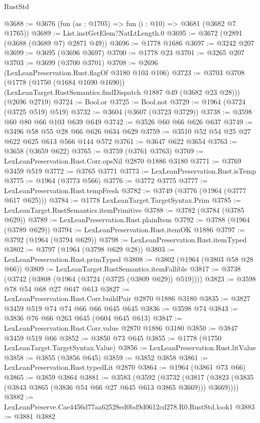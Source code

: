 \begin{lexlean}{RustStd}
\begin{coremodule}
@3688 := @3676 (fun (as : @1705) => fun (i : @10) => @3681 (@3682 @7 @1765))
@3689 := List.instGetElem?NatLtLength.{0}
@3695 := @3672 (@2891 (@3688 (@3689 @7) @2871 @49))
@3696 := @1778 @1686
@3697 := @3242 @207
@3699 := @3695 (@3696 @3697)
@3700 := @1778 @23
@3701 := @3265 @207
@3703 := @3699 (@3700 @3701)
@3708 := @2696 (LexLeanPreservation.Rust.flagOf @3180 @103 @106)
@3723 := @3703
    @3708
    (@1778
      (@1750 (@1684 @1690 @1690))
      (LexLeanTarget.RustSemantics.findDispatch @1887 @49 (@3682 @23 @28)))
    (@2696 @2719)
@3724 := Bool.or
@3725 := Bool.not
@3729 := @1964 (@3724 (@3725 @519) @519)
@3732 := @3604 (@3607 (@3723 @3729))
@3738 := @3598 @60 @80 @66 @103 @639 @649
@3742 := @3526 @60 @66 @626 @637
@3749 := @3496 @58 @55 @28 @66 @626 @634 @629
@3759 := @3510 @52 @54 @25 @27 @622 @625 @613 @566 @144 @572
@3761 := @3647 @622 @3654
@3763 := @3658 (@3659 @622)
@3765 := @3759 (@3761 @3763)
@3769 := LexLeanPreservation.Rust.Corr.opsNil @2870 @1886 @3180
@3771 := @3769 @3459 @519
@3772 := @3765 @3771
@3773 := LexLeanPreservation.Rust.isTemp
@3775 := @1964 (@3773 @566)
@3776 := @3772 @3775
@3777 := LexLeanPreservation.Rust.tempFresh
@3782 := @3749 (@3776 (@1964 (@3777 @617 @625)))
@3784 := @1778 LexLeanTarget.TargetSyntax.Prim
@3785 := LexLeanTarget.RustSemantics.itemPrimitive
@3788 := @3782 (@3784 (@3785 @629))
@3789 := LexLeanPreservation.Rust.plainItem
@3792 := @3788 (@1964 (@3789 @629))
@3794 := LexLeanPreservation.Rust.itemOK @1886
@3797 := @3792 (@1964 (@3794 @629))
@3798 := LexLeanPreservation.Rust.itemTyped
@3802 := @3797 (@1964 (@3798 @629 @28))
@3803 := LexLeanPreservation.Rust.primTyped
@3808 := @3802 (@1964 (@3803 @58 @28 @66))
@3809 := LexLeanTarget.RustSemantics.itemFallible
@3817 := @3738 (@3742 (@3808 (@1964 (@3724 (@3725 (@3809 @629)) @519))))
@3823 := @3598 @78 @54 @68 @27 @647 @613
@3827 := LexLeanPreservation.Rust.Corr.buildPair @2870 @1886 @3180
@3835 := @3827 @3459 @519 @74 @74 @66 @66 @645 @645
@3836 := @3598 @74
@3843 := @3836 @76 @66 @263 @645 (@604 @645 @613)
@3847 := LexLeanPreservation.Rust.Corr.value @2870 @1886 @3180
@3850 := @3847 @3459 @519 @66
@3852 := @3850 @73 @645
@3855 := @1778 (@1750 LexLeanTarget.TargetSyntax.Value)
@3856 := LexLeanPreservation.Rust.litValue
@3858 := @3855 (@3856 @645)
@3859 := @3852 @3858
@3861 := LexLeanPreservation.Rust.typedLit @2870
@3864 := @1964 (@3861 @73 @66)
@3865 := @3859 @3864
@3881 := @3583
    (@3592
      (@3732 (@3817 (@3823 (@3835 (@3843 @3865 (@3836 @54 @66 @27 @645 @613 @3865 @3669))) @3669))))
@3882 := LexLeanPreserve.Cae4456d77aa62528ed0bd9d0612cd278.R0.RustStd.look1
@3883 := @3881 @3882

\end{coremodule}
\end{lexlean}
